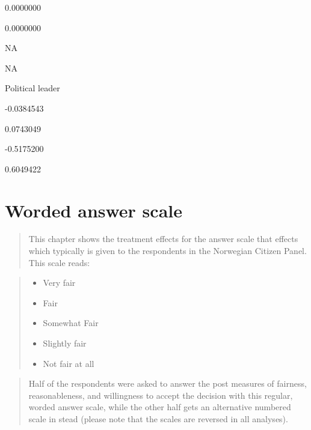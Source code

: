 \documentclass[]{book}
\providecommand{\tightlist}{%
  \setlength{\itemsep}{0pt}\setlength{\parskip}{0pt}}
\begin{document}
0.0000000

0.0000000

NA

NA

Political leader

-0.0384543

0.0743049

-0.5175200

0.6049422

\chapter{Worded answer scale}\label{worded-answer-scale}

\begin{quote}
This chapter shows the treatment effects for the answer scale that
effects which typically is given to the respondents in the Norwegian
Citizen Panel. This scale reads:
\end{quote}

\begin{quote}
\begin{itemize}
\tightlist
\item
  Very fair\\
\item
  Fair\\
\item
  Somewhat Fair\\
\item
  Slightly fair\\
\item
  Not fair at all
\end{itemize}
\end{quote}

\begin{quote}
Half of the respondents were asked to answer the post measures of
fairness, reasonableness, and willingness to accept the decision with
this regular, worded answer scale, while the other half gets an
alternative numbered scale in stead (please note that the scales are
reversed in all analyses).
\end{quote}
\end{document}
